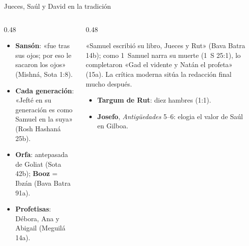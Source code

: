 \begin{frame}{Jueces, Saúl y David en la tradición}
\begin{columns}[T,onlytextwidth]
\begin{column}{0.48\textwidth}\footnotesize
\begin{itemize}
\item \textbf{Sansón}: «fue tras sus ojos; por eso le sacaron los ojos» (Mishná, Sota 1:8).
\item \textbf{Cada generación}: «Jefté en su generación es como Samuel en la suya» (Rosh Hashaná 25b).
\item \textbf{Orfa}: antepasada de Goliat (Sota 42b); \textbf{Booz} = Ibzán (Bava Batra 91a).
\item \textbf{Profetisas}: Débora, Ana y Abigail (Meguilá 14a).
\end{itemize}
\end{column}
\begin{column}{0.48\textwidth}
\begin{notalam}
«Samuel escribió su libro, Jueces y Rut» (Bava Batra 14b); como 1~Samuel narra su muerte (1~S 25:1), lo completaron «Gad el vidente y Natán el profeta» (15a). La crítica moderna sitúa la redacción final mucho después.
\end{notalam}
\footnotesize
\begin{itemize}
\item \textbf{Targum de Rut}: diez hambres (1:1).
\item \textbf{Josefo}, \emph{Antigüedades} 5--6: elogia el valor de Saúl en Gilboa.
\end{itemize}
\end{column}
\end{columns}
\end{frame}

